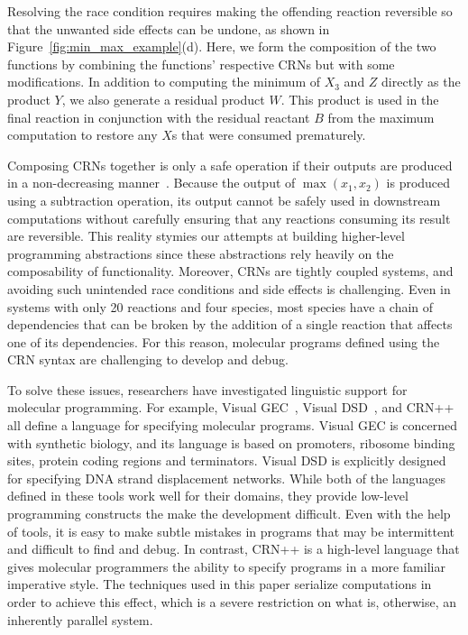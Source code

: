 Resolving the race condition requires making the offending reaction reversible so that the unwanted side effects can be undone, as shown in Figure~\ref{fig:min_max_example}(d).
Here, we form the composition of the two functions by combining the functions' respective CRNs but with some modifications.
In addition to computing the minimum of $X_3$ and $Z$ directly as the product $Y$, we also generate a residual product $W$.
This product is used in the final reaction in conjunction with the residual reactant $B$ from the maximum computation to restore any $X$s that were consumed prematurely.

Composing CRNs together is only a safe operation if their outputs are produced in a non-decreasing manner~\cite{jCKRS18,doty19}.
Because the output of \( \max(x_1, x_2) \) is produced using a subtraction operation, its output cannot be safely used in downstream computations without carefully ensuring that any reactions consuming its result are reversible.
This reality stymies our attempts at building higher-level programming abstractions since these abstractions rely heavily on the composability of functionality.
Moreover, CRNs are tightly coupled systems, and avoiding such unintended race conditions and side effects is challenging.
Even in systems with only 20 reactions and four species, most species have a chain of dependencies that can be broken by the addition of a single reaction that affects one of its dependencies.
For this reason, molecular programs defined using the CRN syntax are challenging to develop and debug.

To solve these issues, researchers have investigated linguistic support for molecular programming.
For example, Visual GEC~\cite{jPedPhi09}, Visual DSD~\cite{jLYPEP11}, and CRN++~\cite{Vasic2020} all define a language for specifying molecular programs.
Visual GEC is concerned with synthetic biology, and its language is based on promoters, ribosome binding sites, protein coding regions and terminators.
Visual DSD is explicitly designed for specifying DNA strand displacement networks.
While both of the languages defined in these tools work well for their domains, they provide low-level programming constructs the make the development difficult.
Even with the help of tools, it is easy to make subtle mistakes in programs that may be intermittent and difficult to find and debug.
In contrast, CRN++ is a high-level language that gives molecular programmers the ability to specify programs in a more familiar imperative style.
The techniques used in this paper serialize computations in order to achieve this effect, which is a severe restriction on what is, otherwise, an inherently parallel system.

